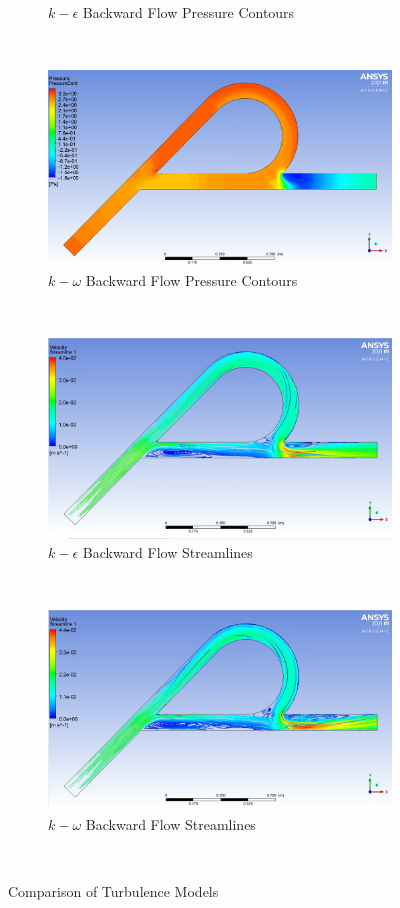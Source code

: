 \begin{figure}[H]
\begin{subfigure}{.45\textwidth}
  \caption{$k-\epsilon$ Backward Flow Pressure Contours}
  \label{fig:x_d_norm}
\end{subfigure}%
~
\begin{subfigure}{.45\textwidth}
  \centering
  \includegraphics[width=.94\linewidth]{images/task3/omega_backward_pressure.png}
  \caption{$k-\omega$ Backward Flow Pressure Contours}
  \label{fig:x_d_norm_actual}
\end{subfigure}
~
\begin{subfigure}{.45\textwidth}
  \centering
  \includegraphics[width=.94\linewidth]{images/task3/epsilon_reverse_streamline.png}
  \caption{$k-\epsilon$ Backward Flow Streamlines}
  \label{fig:x_d_norm}
\end{subfigure}%
~
\begin{subfigure}{.45\textwidth}
  \centering
  \includegraphics[width=.94\linewidth]{images/task3/omega_backward_streamline.png}
  \caption{$k-\omega$ Backward Flow Streamlines}
  \label{fig:x_d_norm_actual}
\end{subfigure}
~
\caption{Comparison of Turbulence Models}
\label{fig:omega_epsilon}
\end{figure}